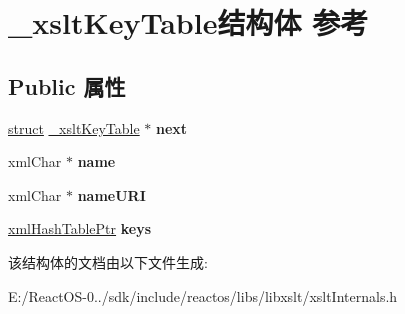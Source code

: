 \hypertarget{struct__xslt_key_table}{}\section{\+\_\+xslt\+Key\+Table结构体 参考}
\label{struct__xslt_key_table}
\subsection*{Public 属性}
\begin{DoxyCompactItemize}
\item 
\mbox{\label{struct__xslt_key_table_ababe84ec1cf6ffb5343ca02651f2ada7}} 
\hyperlink{interfacestruct}{struct} \hyperlink{struct__xslt_key_table}{\+\_\+xslt\+Key\+Table} $\ast$ {\bfseries next}
\item 
\mbox{\label{struct__xslt_key_table_a3c4524c8fb7a4dc2c9cf85f22d2ec246}} 
xml\+Char $\ast$ {\bfseries name}
\item 
\mbox{\label{struct__xslt_key_table_a06277cb830870de2b01f2d02d4ffa6fb}} 
xml\+Char $\ast$ {\bfseries name\+U\+RI}
\item 
\mbox{\label{struct__xslt_key_table_a14f5de2f0066869e4bcac8a25a0c9ca2}} 
\hyperlink{struct__xml_hash_table}{xml\+Hash\+Table\+Ptr} {\bfseries keys}
\end{DoxyCompactItemize}


该结构体的文档由以下文件生成\+:\begin{DoxyCompactItemize}
\item 
E\+:/\+React\+O\+S-\/0../sdk/include/reactos/libs/libxslt/xslt\+Internals.\+h\end{DoxyCompactItemize}
